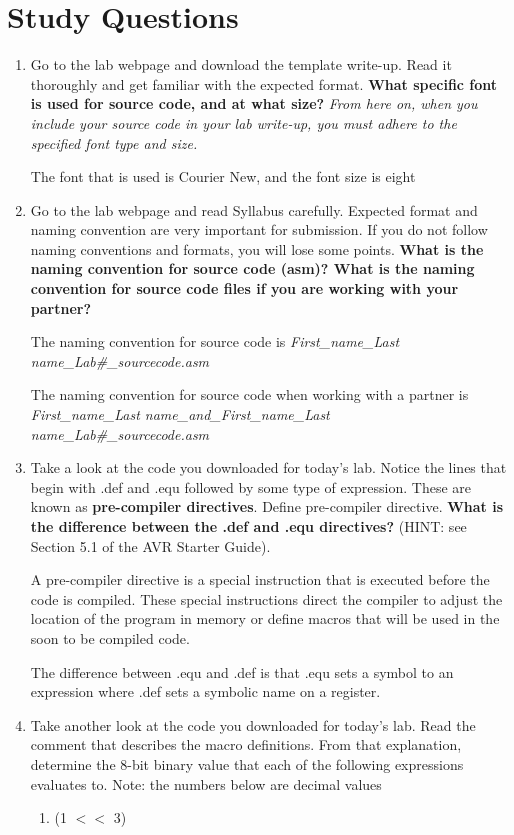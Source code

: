 \documentclass[12pt,letterpaper]{article}
\begin{document}
\section{Study Questions}
\begin{enumerate}
    \item
    Go to the lab webpage and download the template write-up. 
    Read it thoroughly and get familiar with the expected format. 
    \textbf{What specific font is used for source code, and at what size?} 
    \textit{From here on, when you include your source code in your lab write-up, you must adhere to the specified font type and size.}

    The font that is used is Courier New, and the font size is eight
    
    \item
    Go to the lab webpage and read Syllabus carefully. 
    Expected format and naming convention are very important for submission. 
    If you do not follow naming conventions and formats, you will lose some points. 
    \textbf{What is the naming convention for source code (asm)? 
    What is the naming convention for source code files if you are working with your partner?}

	The naming convention for source code is \textit{First\_name\_Last name\_Lab\#\_sourcecode.asm}
	
	The naming convention for source code when working with a partner is \textit{First\_name\_Last name\_and\_First\_name\_Last name\_Lab\#\_sourcecode.asm}

	\item 
	Take a look at the code you downloaded for today’s lab. 
	Notice the lines that begin with .def and .equ followed by some type of expression. 
	These are known as \textbf{pre-compiler directives}. 
	Define pre-compiler directive. \textbf{What is the difference between the .def and .equ directives?} 
	(HINT: see Section 5.1 of the AVR Starter Guide).

	A pre-compiler directive is a special instruction that is executed before the code is compiled.
	These special instructions direct the compiler to adjust the location of the program in memory or define macros that will be used in the soon to be compiled code.
	
	The difference between .equ and .def is that .equ sets a symbol to an expression where .def sets a symbolic name on a register.
	
	
	\item 
	Take another look at the code you downloaded for today’s lab. 
	Read the comment that describes the macro definitions. 
	From that explanation, determine the 8-bit binary value that each of the following expressions evaluates
	to. Note: the numbers below are decimal values
	\begin{enumerate}
		\item 
		(1 $<<$ 3)
		

\end{enumerate}
\end{enumerate}
\end{document}
